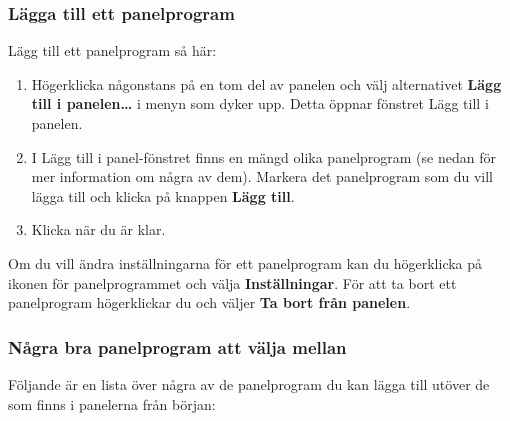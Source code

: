 \documentclass[a4paper,final]{memoir} %
\begin{document}
\subsubsection{Lägga till ett panelprogram}\label{panelprogram}

Lägg till ett panelprogram så här:

\begin{enumerate}

\item Högerklicka någonstans på en tom del av panelen och välj alternativet \textbf{Lägg till i panelen\ldots{}} i menyn som dyker upp. Detta öppnar fönstret Lägg till i panelen.

\item I Lägg till i panel-fönstret finns en mängd olika panelprogram (se nedan för mer information om några av dem). Markera det panelprogram som du vill lägga till och klicka på knappen \textbf{Lägg till}.

\item Klicka \xstang{} när du är klar.

\end{enumerate}

Om du vill ändra inställningarna för ett panelprogram kan du högerklicka på ikonen för panelprogrammet och välja \textbf{Inställningar}. För att ta bort ett panelprogram högerklickar du och väljer \textbf{Ta bort från panelen}.

\subsubsection{Några bra panelprogram att välja mellan}

Följande är en lista över några av de panelprogram du kan lägga till utöver de som finns i panelerna från början:
\end{document}
